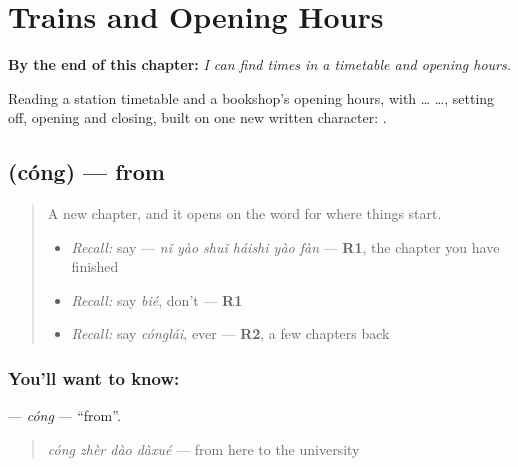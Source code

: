 
\chapter{Trains and Opening Hours}
\label{ch:zh-trains-and-opening-hours}

\begin{chapteropening}
\textbf{By the end of this chapter:} \emph{I can find times in a timetable and opening hours.}

Reading a station timetable and a bookshop's opening hours, with  …  …, setting off, opening and closing, built on one new written character: .
\end{chapteropening}

\section[\texorpdfstring{\zh{从} (cóng)}{从 (cóng)}]{ (cóng) — from}

\label{lesson:ZH-C155-cong}



\begin{quote}
A new chapter, and it opens on the word for where things start.

\begin{itemize}
\raggedright
  \item \emph{Recall:} say  — \emph{nǐ yào shuǐ háishi yào fàn} — \textbf{R1}, the chapter you have finished
  \item \emph{Recall:} say \emph{bié}, don't — \textbf{R1}
  \item \emph{Recall:} say \emph{cónglái}, ever — \textbf{R2}, a few chapters back
\end{itemize}
\end{quote}

\subsection*{You'll want to know: }
\textbf{} — \emph{cóng} — \textquotedblleft{}from\textquotedblright{}.

\begin{quote}
\textbf{} \emph{cóng zhèr dào dàxué} — from here to the university
\end{quote}

